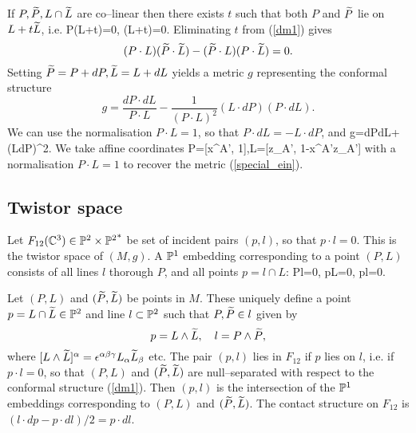 If $P,\widetilde{P},L\cap\widetilde{L}$ are co--linear then there exists $t$ such that both $P$ and $\widetilde{P}$ lie on $L+t\widetilde{L}$, i.e.
\be
\label{dm1}
P\cdot (L+t\tL)=0,  \quad
\tP\cdot (L+t\tL)=0.
\ee 
Eliminating $t$ from 
(\ref{dm1}) gives
\[
(P\cdot L)(\widetilde{P}\cdot \widetilde{L})-(\widetilde{P}\cdot L)(P\cdot \widetilde{L})=0.
\]
Setting $\widetilde{P}=P+dP, \widetilde{L}=L+dL$ yields a metric 
$g$  representing the conformal structure
\[
g=\frac{dP\cdot dL}{P\cdot L}-\frac{1}{(P\cdot L)^2}(L\cdot dP)(P\cdot dL).
\]
We can use the normalisation $P\cdot L=1$, so that $P\cdot dL=-L\cdot dP$,
and
\be
\label{dm_metric}
g={dP\cdot dL}+(L\cdot dP)^2.
\ee
We take affine coordinates 
\be
\label{DM_parameter}
P=[x^{A'}, 1],\quad L=[z_{A'}, 1-x^{A'}z_{A'}]
\ee 
with a normalisation $P\cdot L=1$ to recover the metric (\ref{special_ein}).
\koniec
\subsection{Twistor space}
\label{twist_SSS}
Let $F_{12}(\mathbb{C}^3)\in \mathbb{P}^2\times {\mathbb{P}^2}^*$ be set of incident pairs 
$(p, l)$, so that $p\cdot l=0$. This is the twistor space of $(M, g)$.
A $\mathbb{P}^1$ embedding corresponding to a point $(P, L)$
consists of all lines $l$ thorough $P$, and all points
$p=l\cap L$:
\be
\label{dm2}
P\cdot l=0, \quad p\cdot L=0, \quad p\cdot l=0.
\ee

Let $(P, L)$ and $(\widetilde{P}, \widetilde{L})$ be points in $M$. These uniquely define a point $p=L\cap\widetilde{L}\in\mathbb{P}^2$ and line $l\subset\mathbb{P}^2$ such that $P,\widetilde{P}\in l$ given by
\[
p=L\wedge \widetilde{L}, \quad l=P\wedge \widetilde{P},
\]
where $[L\wedge\widetilde{L}]^{\alpha}=\epsilon^{\alpha\beta\gamma}L_{\alpha}\widetilde{L}_{\beta}$ etc.
The pair $(p,l)$ lies in $F_{12}$ if $p$ lies on $l$, i.e. if $p\cdot l=0$, so that $(P, L)$ and $(\widetilde{P}, \widetilde{L})$ are null--separated with respect to the conformal structure
(\ref{dm1}). Then $(p,l)$ is the intersection of the $\mathbb{P}^1$ embeddings corresponding to $(P, L)$ and $(\widetilde{P}, \widetilde{L})$. The contact structure on $F_{12}$ is $(l\cdot dp-p\cdot dl)/2=p\cdot dl$. 

